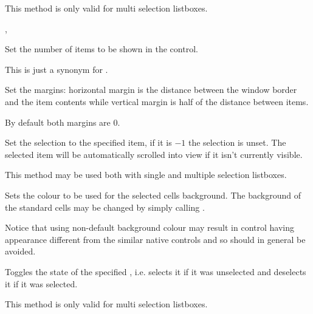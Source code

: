 This method is only valid for multi selection listboxes.


, 

\label{wxvlistboxsetitemcount}


Set the number of items to be shown in the control.

This is just a synonym for
.


\label{wxvlistboxsetmargins}



Set the margins: horizontal margin is the distance between the window
border and the item contents while vertical margin is half of the
distance between items.

By default both margins are $0$.


\label{wxvlistboxsetselection}


Set the selection to the specified item, if it is $-1$ the selection is
unset. The selected item will be automatically scrolled into view if it isn't
currently visible.

This method may be used both with single and multiple selection listboxes.


\label{wxvlistboxsetselectionbackground}


Sets the colour to be used for the selected cells background. The background of
the standard cells may be changed by simply calling
.

Notice that using non-default background colour may result in control having
appearance different from the similar native controls and so should in general
be avoided.




\label{wxvlistboxtoggle}


Toggles the state of the specified , i.e. selects it if it was
unselected and deselects it if it was selected.

This method is only valid for multi selection listboxes.



